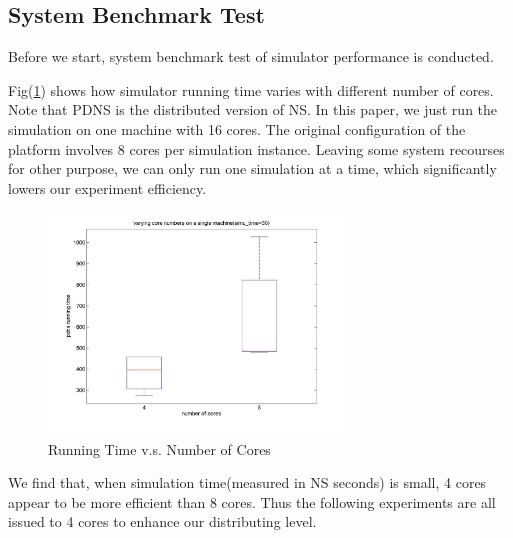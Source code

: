 \documentclass[11pt,a4paper]{article}
\begin{document}


\subsection{System Benchmark Test}

Before we start, system benchmark test of simulator performance
is conducted. 


Fig(\ref{fig:simu_bm_rt_core}) shows how simulator running time 
varies with different number of cores. Note that PDNS \cite{pdns}
is the distributed version of NS\cite{ns}. In this paper, we 
just run the simulation on one machine with 16 cores. The original 
configuration of the platform involves 8 cores per simulation instance. 
Leaving some system recourses for other purpose, we can only 
run one simulation at a time, which significantly lowers our 
experiment efficiency. 

\begin{figure}[htb]
\centering
	\includegraphics[width=0.7\textwidth]{../fig/runtime_vs_core.jpg}
	\caption{Running Time v.s. Number of Cores}
	\label{fig:simu_bm_rt_core}
\end{figure}

We find that, when simulation time(measured in NS seconds) is small, 
4 cores appear to be more efficient than 8 cores. Thus the following 
experiments are all issued to 4 cores to enhance our distributing level. 
\end{document}
